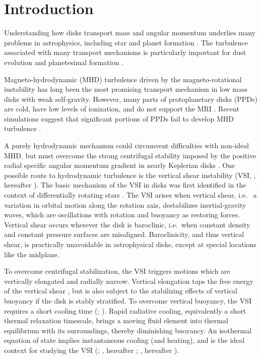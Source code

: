 \documentclass[iop]{emulateapj}
\begin{document}
\section{Introduction}\label{intro}
Understanding how disks transport mass and angular momentum underlies 
many problems in astrophysics, including star and planet formation  
\citep[][]{lyndenbell74, armitage10}.  The turbulence associated with many transport mechanisms
is particularly important for dust evolution and planetesimal formation \citep{yl07, chiang10}. 

Magneto-hydrodynamic (MHD) turbulence driven by
the magneto-rotational instability \citep[MRI,][]{balbus91} has long been the most
promising transport mechanism in low mass disks with weak self-gravity. 
However, many parts of protoplanetary  
disks (PPDs) are cold, have low levels of ionization, and do not support the MRI 
\citep{blaes94,salmeron03}. Recent simulations
suggest that significant portions of PPDs fail to develop MHD
turbulence \citep[e.g.][]{simon13, lesur14,bai15,gressel15}. 

A purely hydrodynamic mechanism could circumvent difficulties with non-ideal MHD, but must overcome
the strong centrifugal stability imposed by the positive radial specific angular
momentum gradient in nearly Keplerian disks \citep{balbus96}.
One possible route to hydrodynamic turbulence is the vertical shear
instability (VSI, \citealp{urpin98, urpin03, nelson13}, hereafter ).  The
basic mechanism of the VSI  in disks was first 
identified in the context of differentially rotating stars \citep[][]{goldreich67,fricke68}.   
The VSI arises when vertical shear, i.e. \ a variation in orbital motion along the rotation axis, 
destabilizes inertial-gravity waves, which are oscillations 
with rotation and buoyancy as restoring forces. Vertical shear
occurs wherever the disk is baroclinic, i.e.\ when constant 
density and constant pressure surfaces are misaligned.  Baroclinicity, and thus vertical shear, is 
practically unavoidable in astrophysical disks, except at special locations like the
midplane. 

To overcome centrifugal stabilization, the VSI triggers motions which are vertically elongated 
and radially narrow.  %
Vertical elongation taps the free energy of the vertical shear \citep{umurhan13}, but is also subject to 
the stabilizing effects of vertical buoyancy if the disk is stably
stratified. To overcome vertical buoyancy, the VSI requires a short cooling time
(\citealp{goldreich67}; ). Rapid radiative 
cooling, equivalently a short thermal relaxation timescale, brings a
moving fluid element into thermal equilibrium with 
its surroundings, thereby diminishing buoyancy. %
An isothermal equation of state implies instantaneous cooling (and
heating), and is the ideal context for studying the VSI
(; \citet{mcnally14}, hereafter ; \citealp{barker15},
hereafter ).    
\end{document}
